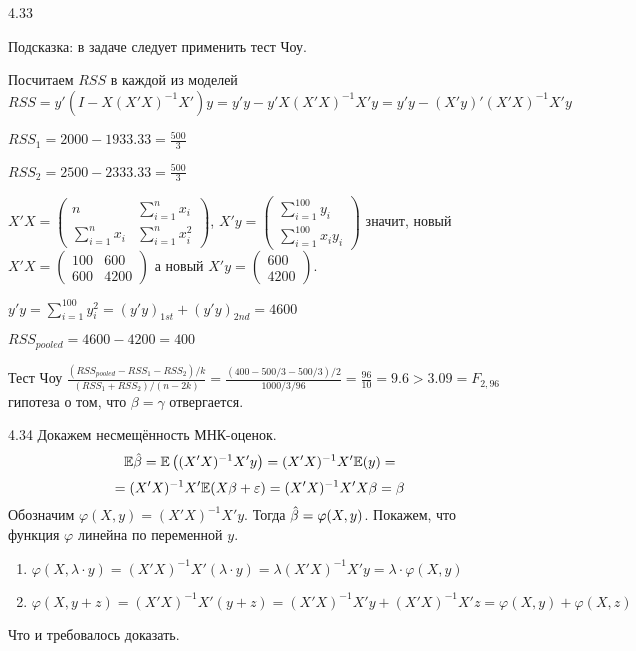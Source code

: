 \begin{solution}{{4.33}}

Подсказка: в задаче следует применить тест Чоу.

Посчитаем $RSS$ в каждой из моделей
\[
RSS=y'(I-X(X'X)^{-1}X')y=y'y-y'X(X'X)^{-1}X'y=y'y-(X'y)'(X'X)^{-1}X'y
\]

$RSS_1=2000-1933.33=\frac{500}{3}$

$RSS_2=2500-2333.33=\frac{500}{3}$

$X'X=
\begin{pmatrix}
n&\sum^n_{i=1}x_i\\
\sum^n_{i=1}x_i&\sum^n_{i=1}x_i^2
\end{pmatrix}$, $X'y=
\begin{pmatrix}
\sum^{100}_{i=1}y_i\\
\sum^{100}_{i=1}x_iy_i
\end{pmatrix}$
значит, новый
$X'X=\begin{pmatrix}
100&600\\
600&4200
\end{pmatrix}$
а новый $X'y=
\begin{pmatrix}
600\\
4200
\end{pmatrix}$.

$y'y=\sum^{100}_{i=1}y_i^2=(y'y)_{1st}+(y'y)_{2nd}=4600$

$RSS_{pooled}=4600-4200=400$

Тест Чоу
$\frac{(RSS_{pooled}-RSS_1-RSS_2)/k}{(RSS_1+RSS_2)/(n-2k)}=\frac{(400-500/3-500/3)/2}{1000/3/96}=\frac{96}{10}=9.6>3.09=F_{2,96}$
гипотеза о том, что $\beta=\gamma$ отвергается.
\end{solution}
\protect \hypertarget {soln:4.34}{}
\begin{solution}{{4.34}}
Докажем несмещённость МНК-оценок.
\[\mathbb{E}\hat{\beta} = \mathbb{E}\left( (X' X)^{-1} X' y \right) = (X' X)^{-1} X' \mathbb{E}(y) = \]
\[= (X' X)^{-1} X' \mathbb{E}(X\beta + \varepsilon) = (X' X)^{-1} X' X\beta = \beta\]
Обозначим $\varphi(X, y) = (X' X)^{-1} X' y$. Тогда $\hat{\beta} = \varphi(X, y)$. Покажем, что функция $\varphi$ линейна по переменной $y$.
\begin{enumerate}
\item $\varphi(X, \lambda \cdot y) = (X' X)^{-1} X' (\lambda \cdot y) = \lambda (X' X)^{-1} X' y = \lambda \cdot \varphi(X, y)$
\item $\varphi(X, y + z) = (X' X)^{-1} X' (y + z) = (X' X)^{-1} X' y + (X' X)^{-1} X' z = \varphi(X, y) + \varphi(X, z)$
\end{enumerate}
Что и требовалось доказать.
\end{solution}
